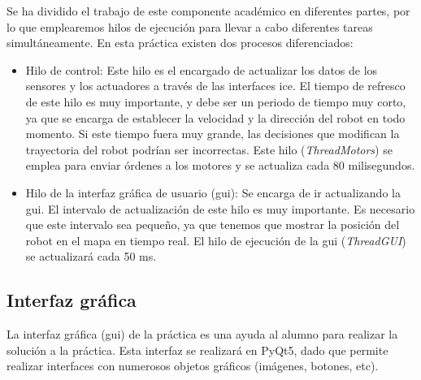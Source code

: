 Se ha dividido el trabajo de este componente académico en diferentes partes, por lo que emplearemos hilos de ejecución para llevar a cabo diferentes tareas simultáneamente. En esta práctica existen dos procesos diferenciados:

\begin{itemize}
\item Hilo de control: Este hilo es el encargado de actualizar los datos de los sensores y los actuadores a través de las interfaces \acrshort{ice}. El tiempo de refresco de este hilo es muy importante, y debe ser un periodo de tiempo muy corto, ya que se encarga de establecer la velocidad y la dirección del robot en todo momento. Si este tiempo fuera muy grande, las decisiones que modifican la trayectoria del robot podrían ser incorrectas. Este hilo (\textit{ThreadMotors}) se emplea para enviar órdenes a los motores y se actualiza cada 80 milisegundos.

\item	Hilo de la interfaz gráfica de usuario (\acrshort{gui}): Se encarga de ir actualizando la \acrshort{gui}. El intervalo de actualización de este hilo es muy importante. Es necesario que este intervalo sea pequeño, ya que tenemos que mostrar la posición del robot en el mapa en tiempo real. El hilo de ejecución de la \acrshort{gui} (\textit{ThreadGUI}) se actualizará cada 50 ms.

\end{itemize}

\subsection{Interfaz gráfica}

La interfaz gráfica (\acrshort{gui}) de la práctica es una ayuda al alumno para realizar la solución a la práctica. Esta interfaz se realizará en PyQt5, dado que permite realizar interfaces con numerosos objetos gráficos (imágenes, botones, etc).\\


